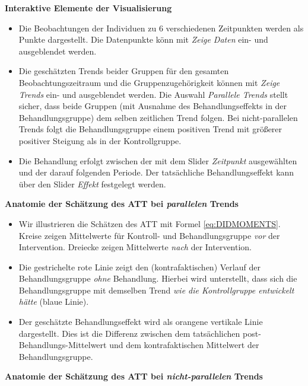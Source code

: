 \documentclass[
  a4paper,
  DIV=11,
  oneside]{scrreprt}
\begin{document}
\textbf{Interaktive Elemente der Visualisierung}

\begin{itemize}
\item
  Die Beobachtungen der Individuen zu 6 verschiedenen Zeitpunkten werden
  als Punkte dargestellt. Die Datenpunkte könn mit \emph{Zeige Daten}
  ein- und ausgeblendet werden.
\item
  Die geschätzten Trends beider Gruppen für den gesamten
  Beobachtungszeitraum und die Gruppenzugehörigkeit können mit
  \emph{Zeige Trends} ein- und ausgeblendet werden. Die Auswahl
  \emph{Parallele Trends} stellt sicher, dass beide Gruppen (mit
  Ausnahme des Behandlungseffekts in der Behandlungsgruppe) dem selben
  zeitlichen Trend folgen. Bei nicht-parallelen Trends folgt die
  Behandlungsgruppe einem positiven Trend mit größerer positiver
  Steigung als in der Kontrollgruppe.
\item
  Die Behandlung erfolgt zwischen der mit dem Slider \emph{Zeitpunkt}
  ausgewählten und der darauf folgenden Periode. Der tatsächliche
  Behandlungseffekt kann über den Slider \emph{Effekt} festgelegt
  werden.
\end{itemize}

\textbf{Anatomie der Schätzung des ATT bei \emph{parallelen} Trends}

\begin{itemize}
\item
  Wir illustrieren die Schätzen des ATT mit Formel
  \eqref{eq:DIDMOMENTS}. Kreise zeigen Mittelwerte für Kontroll- und
  Behandlungsgruppe \emph{vor} der Intervention. Dreiecke zeigen
  Mittelwerte \emph{nach} der Intervention.
\item
  Die gestrichelte rote Linie zeigt den (kontrafaktischen) Verlauf der
  Behandlungsgruppe \emph{ohne} Behandlung. Hierbei wird unterstellt,
  dass sich die Behandlungsgruppe mit demselben Trend \emph{wie die
  Kontrollgruppe entwickelt hätte} (blaue Linie).
\item
  Der geschätzte Behandlungseffekt wird als orangene vertikale Linie
  dargestellt. Dies ist die Differenz zwischen dem tatsächlichen
  post-Behandlungs-Mittelwert und dem kontrafaktischen Mittelwert der
  Behandlungsgruppe.
\end{itemize}

\textbf{Anatomie der Schätzung des ATT bei \emph{nicht-parallelen}
Trends}
\end{document}
